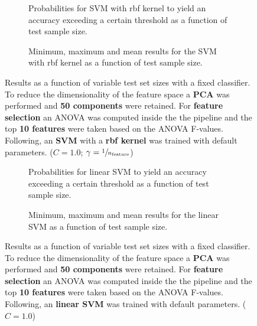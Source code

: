 \begin{figure}
    \captionsetup[subfigure]{justification=justified,singlelinecheck=false}
    \begin{subfigure}[t]{0.61\textwidth}
        
        \caption{Probabilities for SVM with rbf kernel to yield an accuracy exceeding a certain threshold as a function of test sample size.}
    \end{subfigure}
    \hspace{3.0mm}
    \begin{subfigure}[t]{0.34\textwidth}
        
        \caption{Minimum, maximum and mean results for the SVM with rbf kernel as a function of test sample size.}
    \end{subfigure}
    \caption[Effects of varying test sample size. SVM (kernel = rbf); Preprocessing: PCA ($n_\text{components} = \num{50}$); ANOVA feature selection ($k_\text{best} = \num{10}$)]{Results as a function of variable test set sizes with a fixed classifier. To reduce the dimensionality of the feature space a \textbf{PCA} was performed and \textbf{\num{50} components} were retained. For \textbf{feature selection} an ANOVA was computed inside the the pipeline and the top \textbf{\num{10} features} were taken based on the ANOVA F-values. Following, an \textbf{{SVM}} with a \textbf{{rbf kernel}} was trained with default parameters. ($C=\num{1.0}$; $\gamma=\sfrac{1}{n_\text{feature}}$)}
    \label{fig:PCA_50_components_10_best_selected_SVC}
\end{figure}

\begin{figure}
    \captionsetup[subfigure]{justification=justified,singlelinecheck=false}
    \begin{subfigure}[t]{0.61\textwidth}
        
        \caption{Probabilities for linear SVM to yield an accuracy exceeding a certain threshold as a function of test sample size.}
    \end{subfigure}
    \hspace{3.0mm}
    \begin{subfigure}[t]{0.34\textwidth}
        
        \caption{Minimum, maximum and mean results for the linear SVM as a function of test sample size.}
    \end{subfigure}
    \caption[Effects of varying test sample size. Linear SVM; Preprocessing: PCA ($n_\text{components} = \num{50}$); ANOVA feature selection ($k_\text{best} = \num{10}$)]{Results as a function of variable test set sizes with a fixed classifier. To reduce the dimensionality of the feature space a \textbf{PCA} was performed and \textbf{\num{50} components} were retained. For \textbf{feature selection} an ANOVA was computed inside the the pipeline and the top \textbf{\num{10} features} were taken based on the ANOVA F-values. Following, an \textbf{{linear SVM}} was trained with default parameters. ($C=\num{1.0}$)}
    \label{fig:PCA_50_components_10_best_selected_LinearSVC}
\end{figure}

